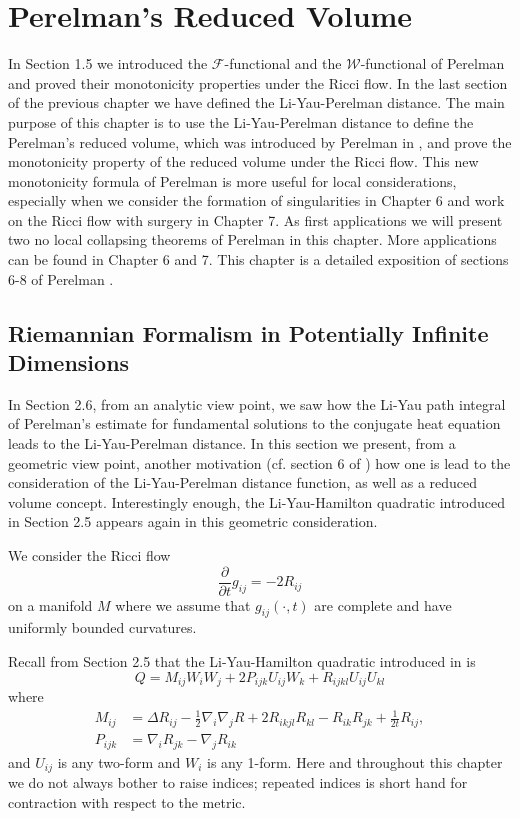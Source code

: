 \chapter{Perelman's Reduced Volume}
\label{chap:cz-reduced-volume}

\bigskip
In Section 1.5 we introduced the $\mathcal{F}$-functional and the
$\mathcal{W}$-functional of Perelman \cite{P1} and proved their
monotonicity properties under the Ricci flow. In the last section
of the previous chapter we have defined the Li-Yau-Perelman
distance. The main purpose of this chapter is to use the
Li-Yau-Perelman distance to define the Perelman's reduced volume,
which was introduced by Perelman in \cite{P1}, and prove the
monotonicity property of the reduced volume under the Ricci flow.
This new monotonicity formula of Perelman \cite{P1} is more useful
for local considerations, especially when we consider the
formation of singularities in Chapter 6 and work on the Ricci flow
with surgery in Chapter 7. As first applications we will present
two no local collapsing theorems of Perelman \cite{P1} in this
chapter. More applications can be found in Chapter 6 and 7. This
chapter is a detailed exposition of sections 6-8 of Perelman
\cite{P1}.


\section{Riemannian Formalism in Potentially Infinite Dimensions}

In Section 2.6, from an analytic view point, we saw how the Li-Yau
path integral of Perelman's estimate for fundamental solutions to
the conjugate heat equation leads to the Li-Yau-Perelman distance.
In this section we present, from a geometric view point, another
motivation (cf. section 6 of \cite{P1}) how one is lead to the
consideration of the Li-Yau-Perelman distance function, as well as
a reduced volume concept. Interestingly enough, the
Li-Yau-Hamilton quadratic introduced in Section 2.5 appears again
in this geometric consideration.

We consider the Ricci flow
$$
\frac{\partial}{\partial t}g_{ij}=-2R_{ij}
$$
on a manifold $M$ where we assume that $g_{ij}(\cdot,t)$ are
complete and have uniformly bounded curvatures.

Recall from Section 2.5 that the Li-Yau-Hamilton quadratic
introduced in \cite{Ha93} is
$$
Q=M_{ij}W_iW_j+2P_{ijk}U_{ij}W_k+R_{ijkl}U_{ij}U_{kl}
$$
where
\begin{align*}
M_{ij}& = \Delta R_{ij}-\frac{1}{2}\nabla_i\nabla_jR
+2R_{ikjl}R_{kl}-R_{ik}R_{jk}+\frac{1}{2t}R_{ij},\\
P_{ijk}&  = \nabla_iR_{jk}-\nabla_jR_{ik}
\end{align*}
and $U_{ij}$ is any two-form and $W_i$ is any 1-form. Here and
throughout this chapter we do not always bother to raise indices;
repeated indices is short hand for contraction with respect to the
metric.

